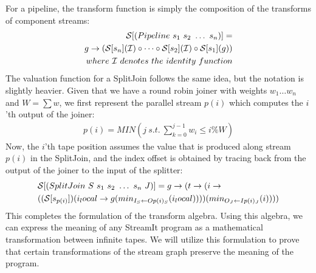 For a pipeline, the transform function is simply the composition of
the transforms of component streams:
\begin{align*}
{\cal S} [(Pipeline~s_1~s_2~\dots~s_n)] = \\
g \ra ({\cal S}[s_n]({\cal I}) \circ \dots \circ {\cal S}[s_2]({\cal I}) \circ {\cal S}[s_1](g)) \\
where~{\cal I}~denotes~the~identity~function
\end{align*}
The valuation function for a SplitJoin follows the same idea, but the
notation is slightly heavier.  Given that we have a round robin joiner
with weights $w_1 \dots w_n$ and $W = \sum{w}$, we first represent the
parallel stream $p(i)$ which computes the $i$'th output of the
joiner:
\begin{align}
\label{eq:p}
p(i) = MIN(j~s.t.~\sum_{k=0}^{j-1}{w_i} \le i\%W)
\end{align}
Now, the $i$'th tape position assumes the value that is produced along
stream $p(i)$ in the SplitJoin, and the index offset is obtained by
tracing back from the output of the joiner to the input of the splitter:
\begin{align*}
&{\cal S} [(SplitJoin~S~s_1~s_2~\dots~s_n~J)] = g \ra (t \ra (i \ra \\
&(({\cal S}[s_{p(i)}])(i_local \ra
g(\mi{I_S}{Op(i)_S}(i_local))))(\mi{O_J}{Ip(i)_J}(i))))
\end{align*}
This completes the formulation of the transform algebra.  Using this
algebra, we can express the meaning of any StreamIt program as a
mathematical transformation between infinite tapes.  We will utilize
this formulation to prove that certain transformations of the stream
graph preserve the meaning of the program.

